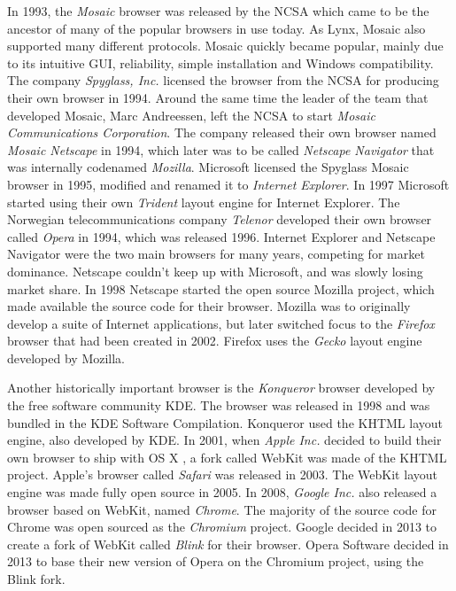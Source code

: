 \documentclass[a4paper,11pt]{kth-mag}
\newcommand\abbr[2][]{\uppercase{#2}\ifthenelse{\equal{#1}{}}%
                     {}{#1}}
\begin{document}
        In 1993, the \emph{Mosaic} \gls{browser} was released by the \gls{NCSA} which came to be the ancestor of many of the popular \glspl{browser} in use today.
        As Lynx, Mosaic also supported many different protocols.
        Mosaic quickly became popular, mainly due to its intuitive \gls{GUI}, reliability, simple installation and Windows compatibility.
        The company \emph{Spyglass, Inc.} licensed the \gls{browser} from the \gls{NCSA} for producing their own \gls{browser} in 1994.
        Around the same time the leader of the team that developed Mosaic, Marc Andreessen, left the \gls{NCSA} to start \emph{Mosaic Communications Corporation}.
        The company released their own \gls{browser} named \emph{Mosaic Netscape} in 1994, which later was to be called \emph{Netscape Navigator} that was internally codenamed \emph{Mozilla}.
        Microsoft licensed the Spyglass Mosaic \gls{browser} in 1995, modified and renamed it to \emph{Internet Explorer}.
        In 1997 Microsoft started using their own \emph{Trident} \gls{layout engine} for Internet Explorer.
        The Norwegian telecommunications company \emph{Telenor} developed their own \gls{browser} called \emph{Opera} in 1994, which was released 1996.
        Internet Explorer and Netscape Navigator were the two main \glspl{browser} for many years, competing for market dominance.
        Netscape couldn't keep up with Microsoft, and was slowly losing market share.
        In 1998 Netscape started the open source Mozilla project, which made available the source code for their \gls{browser}.
        Mozilla was to originally develop a suite of Internet applications, but later switched focus to the \emph{Firefox} \gls{browser} that had been created in 2002.
        Firefox uses the \emph{Gecko} \gls{layout engine} developed by Mozilla.

        Another historically important \gls{browser} is the \emph{Konqueror} \gls{browser} developed by the free software community \gls{KDE}.
        The \gls{browser} was released in 1998 and was bundled in the \gls{KDE} Software Compilation.
        Konqueror used the \abbr{khtml} \gls{layout engine}, also developed by \gls{KDE}.
        In 2001, when \emph{Apple Inc.} decided to build their own \gls{browser} to ship with \abbr{os x}, a \gls{fork} called \gls{WebKit} was made of the \abbr{khtml} project.
        Apple's \gls{browser} called \emph{Safari} was released in 2003.
        The \gls{WebKit} \gls{layout engine} was made fully open source in 2005.
        In 2008, \emph{Google Inc.} also released a \gls{browser} based on \gls{WebKit}, named \emph{Chrome}.
        The majority of the source code for Chrome was open sourced as the \emph{Chromium} project.
        Google decided in 2013 to create a \gls{fork} of \gls{WebKit} called \emph{Blink} for their \gls{browser}.
        Opera Software decided in 2013 to base their new version of Opera on the Chromium project, using the Blink \gls{fork}.
\end{document}
